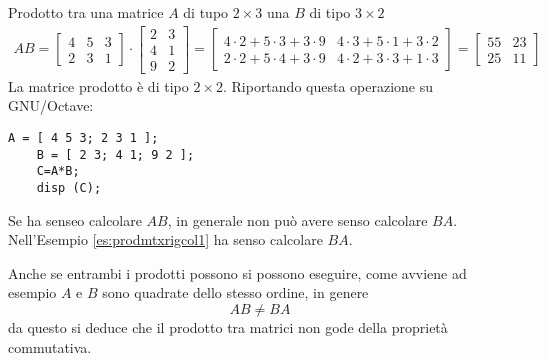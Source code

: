 \begin{es}
  \label{es:prodmtxrigcol1}
  Prodotto tra una matrice $A$ di tupo $2\times 3$ una $B$ di tipo $3\times 2$
  \begin{eqnarray*}
    AB=
    \begin{bmatrix}
      4 & 5 & 3 \\
      2 & 3 & 1
    \end{bmatrix}\cdot
    \begin{bmatrix}
      2 & 3 \\
      4 & 1 \\
      9 & 2
    \end{bmatrix} =
    \begin{bmatrix}
      4\cdot 2 + 5 \cdot 3 + 3\cdot 9 & 4 \cdot 3 + 5 \cdot 1 + 3 \cdot 2\\
      2\cdot 2 + 5 \cdot 4 + 3\cdot 9 & 4 \cdot 2 + 3 \cdot 3 + 1 \cdot 3
    \end{bmatrix}
    =
    \begin{bmatrix}
      55 & 23\\
      25 & 11
    \end{bmatrix}
  \end{eqnarray*}
  La matrice prodotto è di tipo $2\times 2$. Riportando questa operazione su
  GNU/Octave:
  \begin{lstlisting}[caption=moltiplicazione riga per colonna]
    A = [ 4 5 3; 2 3 1 ];
    B = [ 2 3; 4 1; 9 2 ];
    C=A*B;
    disp (C);
  \end{lstlisting}
\end{es}
\begin{oss}
  \label{oss:prodmtxrigcol1}
  Se ha senseo calcolare $AB$, in generale non può avere senso calcolare $BA$.
  Nell'Esempio \ref{es:prodmtxrigcol1} ha senso calcolare $BA$. 
\end{oss}
\begin{oss}
  \label{oss:prodmtxrigcol2}
  Anche se entrambi i prodotti possono si possono eseguire, come avviene ad
  esempio $A$ e $B$ sono quadrate dello stesso ordine, in genere
  \begin{equation*}
    AB\neq BA
  \end{equation*}
  da questo si deduce che il prodotto tra matrici non gode della proprietà
  commutativa.
\end{oss}
